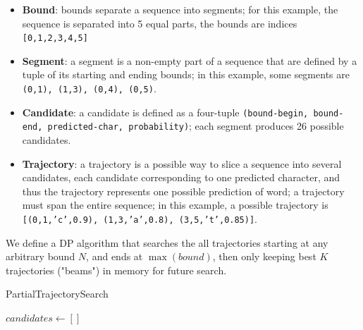 \documentclass{article}
\begin{document}
\begin{multicols*}{2}
\begin{itemize}[leftmargin=*]
    \item \textbf{Bound}: bounds separate a sequence into segments; for this example, the sequence is separated into 5 equal parts, the bounds are indices \texttt{[0,1,2,3,4,5]}
    \item \textbf{Segment}: a segment is a non-empty part of a sequence that are defined by a tuple of its starting and ending bounds; in this example, some segments are \texttt{(0,1), (1,3), (0,4), (0,5)}.
    \item \textbf{Candidate}: a candidate is defined as a four-tuple \texttt{(bound-begin, bound-end, predicted-char, probability)}; each segment produces 26 possible candidates.
    \item \textbf{Trajectory}: a trajectory is a possible way to slice a sequence into several candidates, each candidate corresponding to one predicted character, and thus the trajectory represents one possible prediction of word; a trajectory must span the entire sequence; in this example, a possible trajectory is \texttt{[(0,1,'c',0.9), (1,3,'a',0.8), (3,5,'t',0.85)]}.
\end{itemize}

We define a DP algorithm that searches the all trajectories starting at any arbitrary bound $N$, and ends at $\max(bound)$, then only keeping best $K$ trajectories ("beams") in memory for future search.

\begin{algorithm}[H]
\SetAlgoLined
\caption{PartialTrajectorySearch}

$candidates \gets []$



\end{algorithm}
\end{multicols*}
\end{document}
